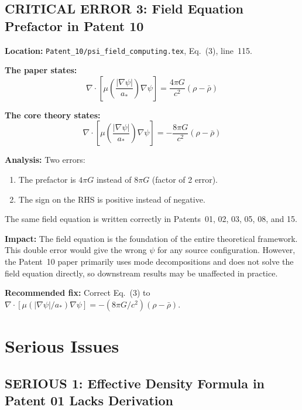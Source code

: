 \documentclass[12pt,a4paper]{article}
\begin{document}
\subsection{CRITICAL ERROR 3: Field Equation Prefactor in Patent 10}
\label{sec:crit3}

\begin{critical}
\textbf{Location:} \texttt{Patent\_10/psi\_field\_computing.tex},
Eq.~(3), line~115.

\medskip
\textbf{The paper states:}
\[
\nabla\cdot\left[\mu\!\left(\frac{|\nabla\psi|}{a_*}\right)\nabla\psi\right]
= \frac{4\pi G}{c^2}(\rho - \bar{\rho})
\]

\medskip
\textbf{The core theory states:}
\[
\nabla\cdot\left[\mu\!\left(\frac{|\nabla\psi|}{a_*}\right)\nabla\psi\right]
= -\frac{8\pi G}{c^2}(\rho - \bar{\rho})
\]

\medskip
\textbf{Analysis:} Two errors:
\begin{enumerate}[nosep]
\item The prefactor is $4\pi G$ instead of $8\pi G$ (factor of 2 error).
\item The sign on the RHS is positive instead of negative.
\end{enumerate}
The same field equation is written correctly in Patents~01, 02, 03, 05, 08,
and 15.

\medskip
\textbf{Impact:} The field equation is the foundation of the entire
theoretical framework. This double error would give the wrong $\psi$ for
any source configuration. However, the Patent~10 paper primarily uses
mode decompositions and does not solve the field equation directly, so
downstream results may be unaffected in practice.

\medskip
\textbf{Recommended fix:} Correct Eq.~(3) to
$\nabla\cdot[\mu(|\nabla\psi|/a_*)\nabla\psi] = -(8\pi G/c^2)(\rho - \bar{\rho})$.
\end{critical}

\section{Serious Issues}
\label{sec:serious}

\subsection{SERIOUS 1: Effective Density Formula in Patent 01 Lacks Derivation}
\label{sec:ser1}
\end{document}
